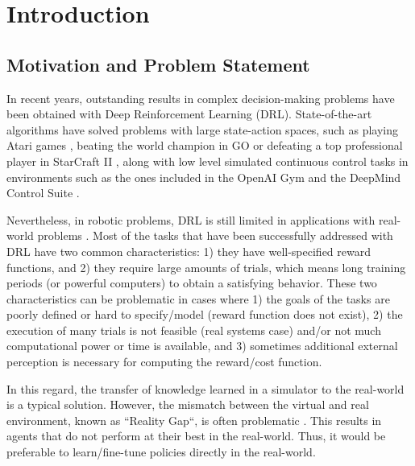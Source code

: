 \chapter{Introduction}
\section{Motivation and Problem Statement}
In  recent years, outstanding results in complex decision-making problems have been obtained with Deep Reinforcement Learning (DRL). State-of-the-art algorithms have solved problems with large state-action spaces, such as playing Atari games \cite{atari}, beating the world champion in GO \cite{Silver2016} or defeating a top professional player in StarCraft II \cite{alphastarblog}, along with low level simulated continuous control tasks in environments such as the ones included in the OpenAI Gym \cite{brockman2016openai} and the DeepMind Control Suite \cite{tassa2018deepmind}. 

Nevertheless, in robotic problems, DRL is still limited in applications with real-world problems \cite{Gu2017}. Most of the tasks that have been successfully addressed with DRL have two common characteristics: 1) they have well-specified reward functions, and 2) they require large amounts of trials, which means long training periods (or powerful computers) to obtain a satisfying behavior. These two characteristics can be problematic in cases where 1) the goals of the tasks are poorly defined or hard to specify/model (reward function does not exist), 2) the execution of many trials is not feasible (real systems case) and/or not much computational power or time is available, and 3) sometimes additional external perception is necessary for computing the reward/cost function.

In this regard, the transfer of knowledge learned in a simulator to the real-world is a typical solution. However, the mismatch between the virtual and real environment, known as ``Reality Gap``, is often problematic \cite{koos2013transferability}. This results in agents that do not perform at their best in the real-world. Thus, it would be preferable to learn/fine-tune policies directly in the real-world.


